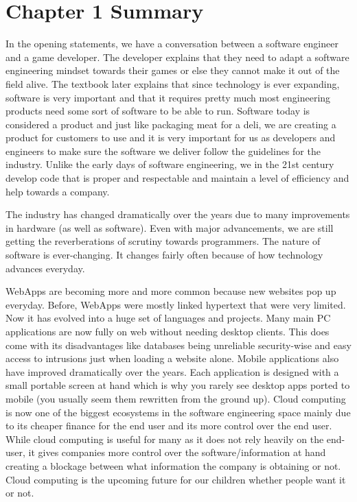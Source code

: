 \documentclass[12pt,a4paper]{article}
\begin{document}

\section{Chapter 1 Summary}
In the opening statements, we have a conversation between a software engineer and a game developer. The developer explains that they need to adapt a software engineering mindset towards their games or else they cannot make it out of the field alive. The textbook later explains that since technology is ever expanding, software is very important and that it requires pretty much most engineering products need some sort of software to be able to run. Software today is considered a product and just like packaging meat for a deli, we are creating a product for customers to use and it is very important for us as developers and engineers to make sure the software we deliver follow the guidelines for the industry. Unlike the early days of software engineering, we in the 21st century develop code that is proper and respectable and maintain a level of efficiency and help towards a company.\par
    The industry has changed dramatically over the years due to many improvements in hardware (as well as software). Even with major advancements, we are still getting the reverberations of scrutiny towards programmers. The nature of software is ever-changing. It changes fairly often because of how technology advances everyday.\par
    WebApps are becoming more and more common because new websites pop up everyday. Before, WebApps were mostly linked hypertext that were very limited. Now it has evolved into a huge set of languages and projects. Many main PC applications are now fully on web without needing desktop clients. This does come with its disadvantages like databases being unreliable security-wise and easy access to intrusions just when loading a website alone. Mobile applications also have improved dramatically over the years. Each application is designed with a small portable screen at hand which is why you rarely see desktop apps ported to mobile (you usually seem them rewritten from the ground up). Cloud computing is now one of the biggest ecosystems in the software engineering space mainly due to its cheaper finance for the end user and its more control over the end user. While cloud computing is useful for many as it does not rely heavily on the end-user, it gives companies more control over the software/information at hand creating a blockage between what information the company is obtaining or not. Cloud computing is the upcoming future for our children whether people want it or not.\par
\end{document}
